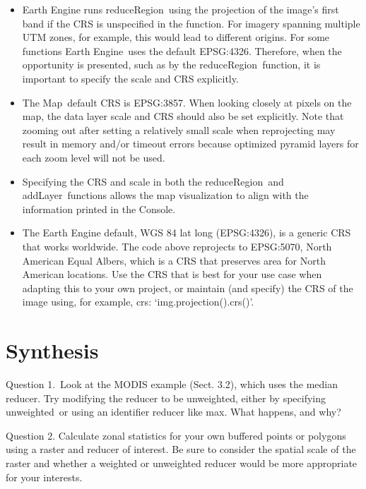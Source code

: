 \documentclass[
  letterpaper,
  DIV=11,
  numbers=noendperiod]{scrreprt}
\providecommand{\tightlist}{%
  \setlength{\itemsep}{0pt}\setlength{\parskip}{0pt}}\usepackage{longtable,booktabs,array}
\begin{document}
\begin{itemize}
\tightlist
\item
  Earth Engine runs reduceRegion~using the projection of the image's
  first band if the CRS is unspecified in the function. For imagery
  spanning multiple UTM zones, for example, this would lead to different
  origins. For some functions Earth Engine~uses the default EPSG:4326.
  Therefore, when the opportunity is presented, such as by the
  reduceRegion~function, it is important to specify the scale and CRS
  explicitly.
\item
  The Map~default CRS is EPSG:3857. When looking closely at pixels on
  the map, the data layer scale and CRS should also be set explicitly.
  Note that zooming out after setting a relatively small scale when
  reprojecting may result in memory and/or timeout errors because
  optimized pyramid layers for each zoom level will not be used.
\item
  Specifying the CRS and scale in both the reduceRegion~and
  addLayer~functions allows the map visualization to align with the
  information printed in the Console.
\item
  The Earth Engine default, WGS 84 lat long (EPSG:4326), is a generic
  CRS that works worldwide. The code above reprojects to EPSG:5070,
  North American Equal Albers, which is a CRS that preserves area for
  North American locations. Use the CRS that is best for your use case
  when adapting this to your own project, or maintain (and specify) the
  CRS of the image using, for example, crs: `img.projection().crs()'.
\end{itemize}

\hypertarget{synthesis-15}{%
\section*{Synthesis}\label{synthesis-15}}


Question 1.~Look at the MODIS example (Sect. 3.2), which uses the median
reducer. Try modifying the reducer to be unweighted, either by
specifying unweighted~or using an identifier reducer like max. What
happens, and why?

Question 2. Calculate zonal statistics for your own buffered points or
polygons using a raster and reducer of interest. Be sure to consider the
spatial scale of the raster and whether a weighted or unweighted reducer
would be more appropriate for your interests.
\end{document}
